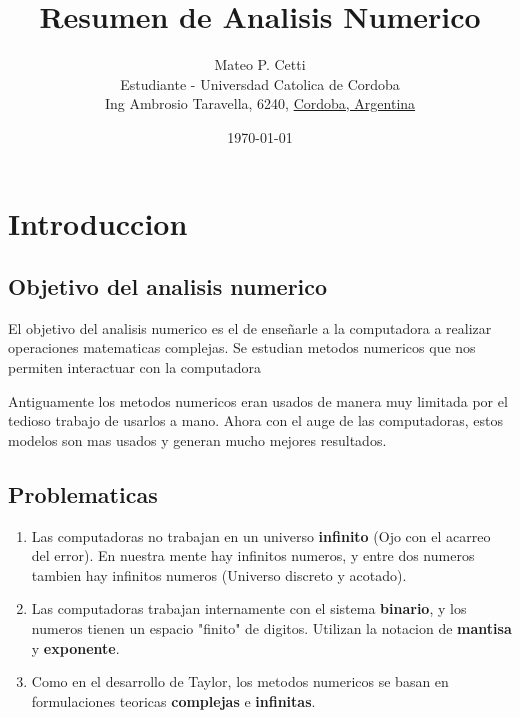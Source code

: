 \documentclass[10pt]{article}
\begin{document}
 
\title{Resumen de Analisis Numerico}
\author{
        Mateo P. Cetti \\
        Estudiante - Universdad Catolica de Cordoba\\
        Ing Ambrosio Taravella, 6240, \underline{Cordoba, Argentina}
}
\date{\today}

\maketitle

\section{Introduccion}

\subsection{Objetivo del analisis numerico}

El objetivo del analisis numerico es el de enseñarle 
a la computadora a realizar operaciones matematicas complejas.
Se estudian metodos numericos que nos permiten interactuar con la computadora

Antiguamente los metodos numericos eran usados de manera muy limitada por el 
tedioso trabajo de usarlos a mano. Ahora con el auge de las computadoras, 
estos modelos son mas usados y generan mucho mejores resultados.

\subsection{Problematicas}

\begin{enumerate}
	\item Las computadoras no trabajan en un universo \textbf{infinito} (Ojo con el acarreo del error). En nuestra mente
	hay infinitos numeros, y entre dos numeros tambien hay infinitos numeros (Universo discreto y acotado).
	\item Las computadoras trabajan internamente con el sistema \textbf{binario}, y los numeros
	tienen un espacio "finito" de digitos. Utilizan la notacion de \textbf{mantisa} y \textbf{exponente}.
	\item Como en el desarrollo de Taylor, los metodos numericos se basan en formulaciones 
	teoricas \textbf{complejas} e \textbf{infinitas}.
\end{enumerate}

\pagebreak
\end{document}
